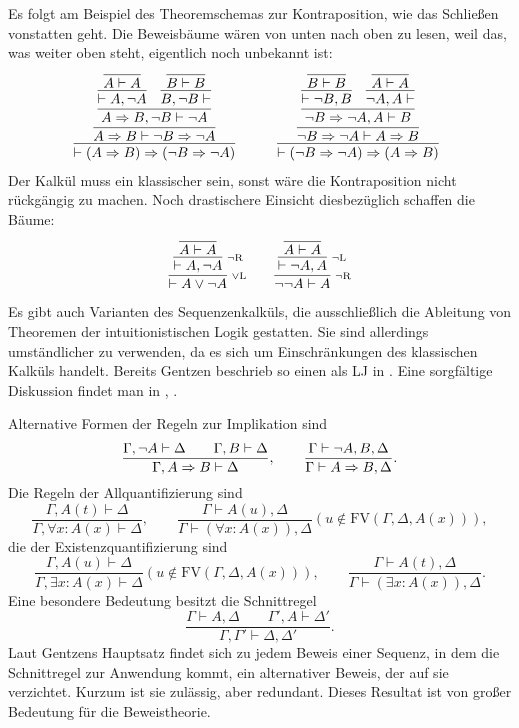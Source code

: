Es folgt am Beispiel des Theoremschemas zur Kontraposition, wie das
Schließen vonstatten geht. Die Beweisbäume wären von unten nach oben
zu lesen, weil das, was weiter oben steht, eigentlich noch unbekannt ist:
\[
\begin{array}{@{}l@{\qquad\quad}l}
\infer{\vdash (A\cond B)\cond (\lnot B\cond\lnot A)}{
  \infer{A\cond B\vdash\lnot B\cond\lnot A}{
    \infer{A\cond B, \lnot B\vdash\lnot A}{
      \infer{\vdash A, \lnot A}{
        \infer{A\vdash A}{}}
    & \infer{B, \lnot B\vdash}{
        \infer{B\vdash B}{}}}}}
&
\infer{\vdash (\lnot B\cond\lnot A)\cond (A\cond B)}{
  \infer{\lnot B\cond\lnot A\vdash A\cond B}{
    \infer{\lnot B\cond\lnot A, A\vdash B}{
      \infer{\vdash \lnot B, B}{
        \infer{B\vdash B}{}}
    & \infer{\lnot A, A\vdash}{
        \infer{A\vdash A}{}}}}}
\end{array}
\]
Der Kalkül muss ein klassischer sein, sonst wäre die Kontraposition
nicht rückgängig zu machen. Noch drastischere Einsicht diesbezüglich
schaffen die Bäume:
\[
\begin{array}{l@{\qquad}l}
\infer[\infernote{$\lor$L}]{\vdash A\lor\lnot A}{
  \infer[\infernote{$\lnot$R}]{\vdash A,\lnot A}{
    \infer{A\vdash A}{}}}
&
\infer[\infernote{$\lnot$R}]{\lnot\lnot A\vdash A}{
  \infer[\infernote{$\lnot$L}]{\vdash\lnot A, A}{
    \infer{A\vdash A}{}}}
\end{array}
\]
Es gibt auch Varianten des Sequenzenkalküls, die ausschließlich die
Ableitung von Theoremen der intuitionistischen Logik gestatten. Sie sind
allerdings umständlicher zu verwenden, da es sich um Einschränkungen des
klassischen Kalküls handelt. Bereits Gentzen beschrieb so einen
als LJ in \cite{Gentzen1935}. Eine sorgfältige Diskussion findet man
in \cite{Mimram}, \cite{von-Plato-Reasoning}.

Alternative Formen der Regeln zur Implikation sind
\[\dfrac{\Gamma,\lnot A\vdash\Delta\qquad\Gamma, B\vdash\Delta}
{\Gamma, A\Rightarrow B\vdash\Delta},\qquad
\dfrac{\Gamma\vdash \lnot A, B,\Delta}{\Gamma\vdash A\Rightarrow B,\Delta}.\]
Die Regeln der Allquantifizierung sind
\[\dfrac{\Gamma, A(t)\vdash\Delta}{\Gamma,\forall x\colon A(x)\vdash\Delta},\qquad
\dfrac{\Gamma\vdash A(u),\Delta}{\Gamma\vdash (\forall x\colon A(x)),\Delta}
(u\notin\mathrm{FV}(\Gamma,\Delta,A(x))),\]
die der Existenzquantifizierung sind
\[\dfrac{\Gamma, A(u)\vdash\Delta}{\Gamma,\exists x\colon A(x)\vdash\Delta}
(u\notin\mathrm{FV}(\Gamma,\Delta,A(x))),\qquad
\dfrac{\Gamma\vdash A(t),\Delta}{\Gamma\vdash (\exists x\colon A(x)),\Delta}.\]
Eine besondere Bedeutung besitzt die Schnittregel
\[\dfrac{\Gamma\vdash A,\Delta\qquad\Gamma',A\vdash\Delta'}
{\Gamma,\Gamma'\vdash\Delta,\Delta'}.\]
Laut Gentzens Hauptsatz findet sich zu jedem Beweis einer Sequenz,
in dem die Schnittregel zur Anwendung kommt, ein alternativer Beweis,
der auf sie verzichtet. Kurzum ist sie zulässig, aber redundant. Dieses
Resultat ist von großer Bedeutung für die Beweistheorie.

